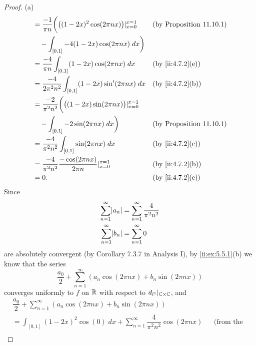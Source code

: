 \begin{proof}{(a)}
\begin{align*}
        & = \dfrac{-1}{\pi n} \bigg(\big((1 - 2x)^2 \cos(2 \pi n x)\big)|_{x = 0}^{x = 1}   &  & \text{(by Proposition 11.10.1)} \\
        & \quad - \int_{[0, 1]} -4 (1 - 2x) \cos(2 \pi n x) \; dx\bigg)                                                          \\
        & = \dfrac{-4}{\pi n} \int_{[0, 1]} (1 - 2x) \cos(2 \pi n x) \; dx                  &  & \by{ii:4.7.2}[e]                \\
        & = \dfrac{-4}{2 \pi^2 n^2} \int_{[0, 1]} (1 - 2x) \sin'(2 \pi n x) \; dx           &  & \by{ii:4.7.2}[b]                \\
        & = \dfrac{-2}{\pi^2 n^2} \bigg(\big((1 - 2x) \sin(2 \pi n x)\big)|_{x = 0}^{x = 1}                                      \\
        & \quad - \int_{[0, 1]} -2 \sin(2 \pi n x) \; dx\bigg)                              &  & \text{(by Proposition 11.10.1)} \\
        & = \dfrac{-4}{\pi^2 n^2} \int_{[0, 1]} \sin(2 \pi n x) \; dx                       &  & \by{ii:4.7.2}[e]                \\
        & = \dfrac{-4}{\pi^2 n^2} \dfrac{-\cos(2 \pi n x)}{2 \pi n}|_{x = 0}^{x = 1}        &  & \by{ii:4.7.2}[b]                \\
        & = 0.                                                                              &  & \by{ii:4.7.2}[e]
  \end{align*}
  Since
  \begin{align*}
    \sum_{n = 1}^\infty \abs{a_n} & = \sum_{n = 1}^\infty \dfrac{4}{\pi^2 n^2} \\
    \sum_{n = 1}^\infty \abs{b_n} & = \sum_{n = 1}^\infty 0
  \end{align*}
  are absolutely convergent (by Corollary 7.3.7 in Analysis I), by \cref{ii:ex:5.5.1}(b) we know that the series
  \[
    \dfrac{a_0}{2} + \sum_{n = 1}^\infty (a_n \cos(2 \pi n x) + b_n \sin(2 \pi n x))
  \]
  converges uniformly to \(f\) on \(\mathbb{R}\) with respect to \(d_{l^1}|_{\mathbb{C} \times \mathbb{C}}\), and
  \begin{align*}
     & \dfrac{a_0}{2} + \sum_{n = 1}^\infty (a_n \cos(2 \pi n x) + b_n \sin(2 \pi n x))                                                                                                 \\
     & = \int_{[0, 1]} (1 - 2x)^2 \cos(0) \; dx + \sum_{n = 1}^\infty \dfrac{4}{\pi^2 n^2} \cos(2 \pi n x)                                           &  & \text{(from the proof above)} \\

\end{align*}
\end{proof}
